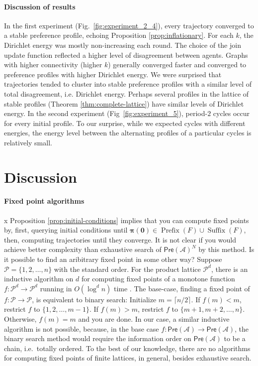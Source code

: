 \documentclass[conference]{ieeeconf}
\newcommand{\A}{\mathcal{A}}
\renewcommand{\P}{\mathcal{P}}
\newcommand{\Pref}{\mathsf{Pre}}
\DeclareMathOperator{\Pre}{Prefix}
\DeclareMathOperator{\Post}{Suffix}
\begin{document}
\paragraph*{Discussion of results}
In the first experiment (Fig.~\ref{fig:experiment_2_4}), every trajectory converged to a stable preference profile, echoing Proposition \ref{prop:inflationary}. For each $k$, the Dirichlet energy was mostly non-increasing each round. The choice of the join update function reflected a higher level of disagreement between agents. Graphs with higher connectivity (higher $k$) generally converged faster and converged to preference profiles with higher Dirichlet energy. We were surprised that trajectories tended to cluster into stable preference profiles with a similar level of total disagreement, i.e. Dirichlet energy. Perhaps several profiles in the lattice of stable profiles (Theorem \ref{thm:complete-lattice}) have similar levels of Dirichlet energy. In the second experiment (Fig~\ref{fig:experiment_5}), period-$2$ cycles occur for every initial profile. To our surprise, while we expected cycles with different energies, the energy level between the alternating profiles of a particular cycles is relatively small.


\section{Discussion}
\label{sec:discussion}

\paragraph*{Fixed point algorithms}x
Proposition \ref{prop:initial-conditions} implies that you can compute fixed points by, first, querying initial conditions until $\boldsymbol{\pi(0)} \in \Pre(F) \cup \Post(F)$, then, computing trajectories until they converge. It is not clear if you would achieve better complexity than exhaustive search of $\Pref(\A)^N$ by this method. Is it possible to find an aribitrary fixed point in some other way? Suppose $\P = \{1,2,\dots,n\}$ with the standard order. For the product lattice $\P^d$, there is an inductive algorithm on $d$ for computing fixed points of a monotone function $f: \P^d \to \P^d$ running in $O(\log^d n)$ time \cite{?}. The base-case, finding a fixed point of $f: \P \to \P$, is equivalent to binary search: Initialize $m = \lceil n/2 \rceil$. If $f(m) < m$, restrict $f$ to $\{1,2,\dots,m-1\}$. If $f(m) > m$, restrict $f$ to $\{m+1,m+2,\dots,n\}$. Otherwise, $f(m) = m$ and you are done. In our case, a similar inductive algorithm is not possible, because, in the base case $f: \Pref(\A) \to \Pref(\A)$, the binary search method would require the information order on $\Pref(\A)$ to be a chain, i.e.~totally ordered. To the best of our knowledge, there are no algorithms for computing fixed points of finite lattices, in general, besides exhaustive search.
\end{document}
